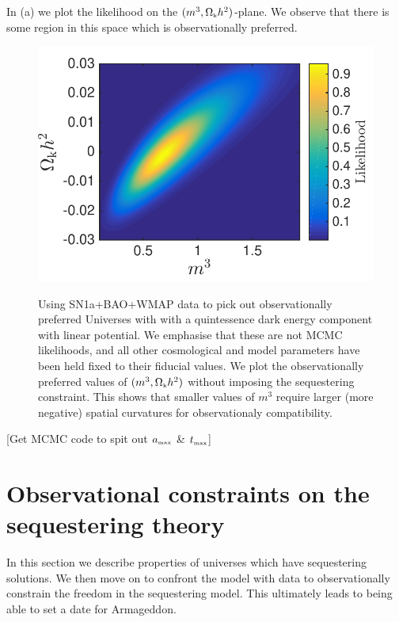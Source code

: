 \documentclass[amsmath,amssymb,10pt,twocolumn,eqsecnum]{revtex4}
\newcommand{\comment}[1]{{\color{red}[#1]}}
\begin{document}
In (a) we plot the likelihood on the $(m^3, {\Omega}_{\scriptscriptstyle{\textrm{k}}}h^2)$-plane. We observe that there is some region in this space which is observationally preferred. 

\begin{figure}[!t]
      \begin{center}
{\includegraphics[scale=0.5]{images/test22_2_L_GR}}
      \end{center}
\caption{Using  SN1a+BAO+WMAP data   to pick out observationally preferred        Universes with with a quintessence dark energy component with linear potential. We emphasise that these are not MCMC likelihoods, and all other cosmological and model parameters have been held fixed to their fiducial values. We plot the observationally preferred values of $(m^3, {\Omega}_{\scriptscriptstyle{\textrm{k}}}h^2)$ without imposing the sequestering constraint. This shows that smaller values of $m^3$ require larger (more negative) spatial curvatures for observationaly compatibility.   }\label{fig:plots-like}
\end{figure}

\comment{Get MCMC code to spit out ${a}_{\scriptscriptstyle{\textrm{max}}}$ \& ${t}_{\scriptscriptstyle{\textrm{max}}}$}

\section{Observational constraints on the sequestering theory} 
In this section we describe properties of universes which have sequestering solutions. We then move on to confront the model with   data to observationally constrain the freedom in the sequestering model. This ultimately leads to being able to set a date for Armageddon.
\end{document}
